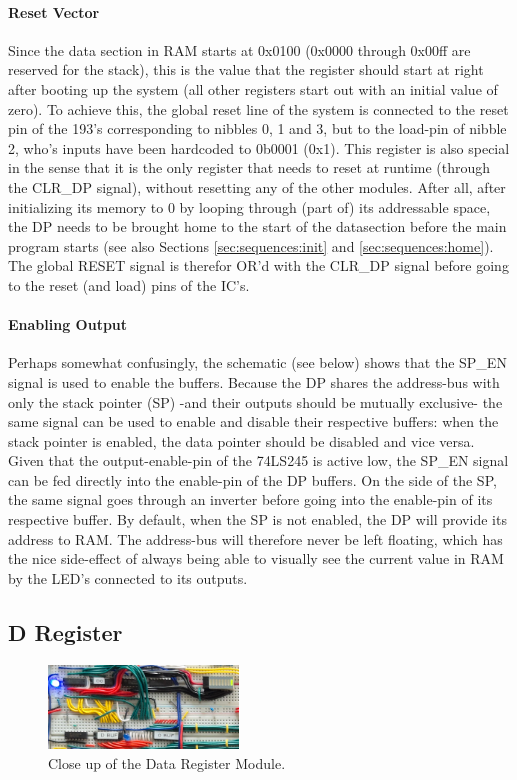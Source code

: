 \paragraph{Reset Vector} Since the data section in RAM starts at 0x0100 (0x0000 through 0x00ff are reserved for the stack), this is the value that the register should start at right after booting up the system (all other registers start out with an initial value of zero). To achieve this, the global reset line of the system is connected to the reset pin of the 193's corresponding to nibbles 0, 1 and 3, but to the load-pin of nibble 2, who's inputs have been hardcoded to 0b0001 (0x1). This register is also special in the sense that it is the only register that needs to reset at runtime (through the CLR\_DP signal), without resetting any of the other modules. After all, after initializing its memory to 0 by looping through (part of) its addressable space, the DP needs to be brought home to the start of the datasection before the main program starts (see also Sections \ref{sec:sequences:init} and \ref{sec:sequences:home}). The global RESET signal is therefor OR'd with the CLR\_DP signal before going to the reset (and load) pins of the IC's.

\paragraph{Enabling Output} Perhaps somewhat confusingly, the schematic (see below) shows that the SP\_EN signal is used to enable the buffers. Because the DP shares the address-bus with only the stack pointer (SP) -and their outputs should be mutually exclusive- the same signal can be used to enable and disable their respective buffers: when the stack pointer is enabled, the data pointer should be disabled and vice versa. Given that the output-enable-pin of the 74LS245 is active low, the SP\_EN signal can be fed directly into the enable-pin of the DP buffers. On the side of the SP, the same signal goes through an inverter before going into the enable-pin of its respective buffer. By default, when the SP is not enabled, the DP will provide its address to RAM. The address-bus will therefore never be left floating, which has the nice side-effect of always being able to visually see the current value in RAM by the LED's connected to its outputs. 


\newpage\subsection{D Register}
\begin{figure}[H]
  \centering
  \includegraphics[width=0.45\textwidth]{img/dregistercloseup}
  \caption{Close up of the Data Register Module.}
  \label{fig:dregcloseup}
\end{figure}

